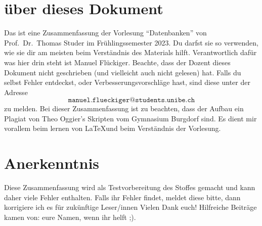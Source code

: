 \documentclass[../DatenbankenFS23.tex]{subfiles}
\begin{document}
\section*{\"uber dieses Dokument}
Das ist eine Zusammenfassung
der Vorlesung ``Datenbanken''
von Prof.\ Dr.\ Thomas Studer
im Fr\"uhlingssemester 2023.
Du darfst sie so verwenden,
wie sie dir am meisten
beim Verst\"andnis des Materials
hilft.
Verantwortlich daf\"ur was
hier drin steht ist Manuel Fl\"uckiger.
Beachte, dass der Dozent dieses Dokument
nicht geschrieben (und vielleicht auch nicht gelesen) hat.
Falls du selbst Fehler entdeckst, oder Verbesserungsvorschl\"age hast,
sind diese unter der Adresse
\[
  \texttt{manuel.flueckiger@students.unibe.ch}
\]
zu melden.
Bei dieser Zusammenfassung ist zu beachten, dass der Aufbau ein Plagiat 
von Theo Oggier's Skripten vom Gymnasium Burgdorf sind.
Es dient mir vorallem beim lernen von \LaTeX und beim Verst\"andnis der Vorlesung.


\section*{Anerkenntnis}
Diese Zusammenfassung wird als Testvorbereitung des 
Stoffes gemacht und kann daher viele Fehler enthalten.
Falls ihr Fehler findet, meldet diese bitte, dann korrigiere ich es f\"ur zuk\"unftige Leser/innen
Vielen Dank euch! Hilfreiche Beitr\"age kamen
von: \newline
 eure Namen, wenn ihr helft ;).
\end{document}
